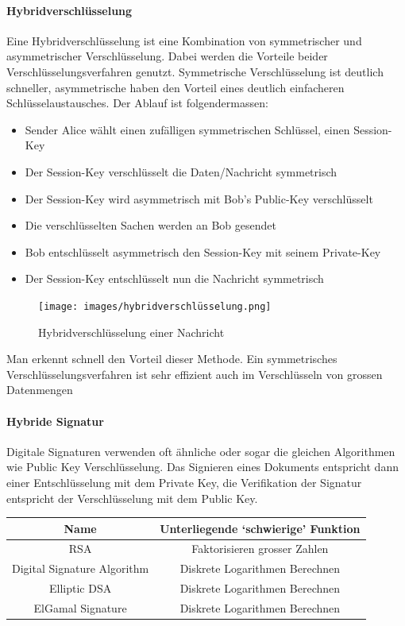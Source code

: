 \documentclass[10pt,a4paper]{article}
\begin{document}
\paragraph*{Hybridverschlüsselung}Eine Hybridverschlüsselung ist eine Kombination von symmetrischer und asymmetrischer Verschlüsselung. Dabei werden die Vorteile beider Verschlüsselungsverfahren genutzt. Symmetrische Verschlüsselung ist deutlich schneller, asymmetrische haben den Vorteil eines deutlich einfacheren Schlüsselaustausches. Der Ablauf ist folgendermassen:
\begin{itemize}[noitemsep,topsep=0pt,leftmargin=*]
    \item Sender Alice wählt einen zufälligen symmetrischen Schlüssel, einen Session-Key
    \item Der Session-Key verschlüsselt die Daten/Nachricht symmetrisch
    \item Der Session-Key wird asymmetrisch mit Bob's Public-Key verschlüsselt
    \item Die verschlüsselten Sachen werden an Bob gesendet
    \item Bob entschlüsselt asymmetrisch den Session-Key mit seinem Private-Key
    \item Der Session-Key entschlüsselt nun die Nachricht symmetrisch
\end{itemize}
\begin{figure}[H]
    \begin{center}
    \texttt{[image: images/hybridverschlüsselung.png]}
    \caption{Hybridverschlüsselung einer Nachricht}
    \label{hybrid}
    \end{center}
\end{figure}
Man erkennt schnell den Vorteil dieser Methode. Ein symmetrisches Verschlüsselungsverfahren ist sehr effizient auch im Verschlüsseln von grossen Datenmengen

\paragraph*{Hybride Signatur}Digitale Signaturen verwenden oft ähnliche oder sogar die gleichen Algorithmen wie Public Key Verschlüsselung. Das Signieren eines Dokuments entspricht dann einer Entschlüsselung mit dem Private Key, die Verifikation der Signatur entspricht der Verschlüsselung mit dem Public Key.\\
\begin{tabular}{|cc|}
    \hline
        Name&Unterliegende `schwierige' Funktion\\
        \hline
        RSA&Faktorisieren grosser Zahlen\\
        Digital Signature Algorithm&Diskrete Logarithmen Berechnen\\
        Elliptic DSA&Diskrete Logarithmen Berechnen\\
        ElGamal Signature&Diskrete Logarithmen Berechnen\\
    \hline
\end{tabular}
\end{document}
